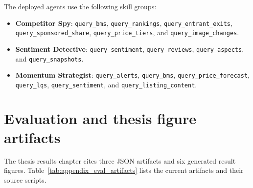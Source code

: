 \begin{samepage}
The deployed agents use the following skill groups:
\begin{itemize}
  \item \textbf{Competitor Spy}: \texttt{query\_bms}, \texttt{query\_rankings}, \texttt{query\_entrant\_exits}, \texttt{query\_sponsored\_share}, \texttt{query\_price\_tiers}, and \texttt{query\_image\_changes}.
  \item \textbf{Sentiment Detective}: \texttt{query\_sentiment}, \texttt{query\_reviews}, \texttt{query\_aspects}, and \texttt{query\_snapshots}.
  \item \textbf{Momentum Strategist}: \texttt{query\_alerts}, \texttt{query\_bms}, \texttt{query\_price\_forecast}, \texttt{query\_lqs}, \texttt{query\_sentiment}, and \texttt{query\_listing\_content}.
\end{itemize}
\end{samepage}

\section{Evaluation and thesis figure artifacts}

The thesis results chapter cites three JSON artifacts and six generated result figures. Table~\ref{tab:appendix_eval_artifacts} lists the current artifacts and their source scripts.

